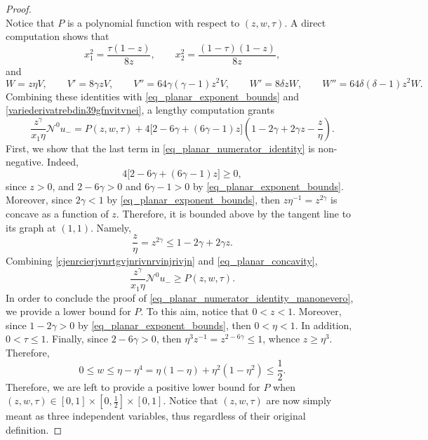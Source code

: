 \documentclass[11pt]{amsart}
\renewcommand{\leq}{\leqslant}
\renewcommand{\geq}{\geqslant}
\renewcommand{\le}{<}
\renewcommand{\ge}{>}
\theoremstyle{definition}
\theoremstyle{remark}
\numberwithin{equation}{section}
\begin{document}
\begin{proof}
\begin{equation*}
\end{equation*}
Notice that $P$ is a polynomial function with respect to $(z,w,\tau)$.
A direct computation shows that 
\begin{equation}\label{duecoseederftrgrrgt}
    x_1^2=\frac{\tau(1-z)}{8z},\qquad x_2^2=\frac{(1-\tau)(1-z)}{8z}, 
\end{equation}
and
\begin{equation}\label{formuleernciefjvntijgvntrvijnvijnvr}
    W=z\eta V,\qquad V'=8\gamma zV,\qquad V''=64\gamma(\gamma-1)z^2V,\qquad W'=8\delta zW,\qquad W''=64\delta(\delta-1)z^2W.
\end{equation}
Combining these identities with \eqref{eq_planar_exponent_bounds} and \eqref{variederivatrebdin39gfnvitvnei}, a lengthy computation grants
\begin{equation}\label{eq_planar_numerator_identity}
 \frac{z^\gamma}{x_1\eta}\mathcal N^0u_-
 =P(z,w,\tau)+4\big[2-6\gamma+(6\gamma-1)z\big]
       \left(1-2\gamma+2\gamma z-\frac z\eta\right).
\end{equation}
First, we show that the last term in \eqref{eq_planar_numerator_identity} is non-negative. Indeed, 
\begin{equation}\label{cjenrcierjvnrtgvjnrivnrvinjrivjn}
    4\big[2-6\gamma+(6\gamma-1)z\big]\geq 0,
\end{equation}
since $z\ge 0$, and $2-6\gamma\ge 0$ and $6\gamma-1\ge 0$ by \eqref{eq_planar_exponent_bounds}. Moreover, since $2\gamma\le 1$ by \eqref{eq_planar_exponent_bounds}, then $z\eta^{-1}=z^{2\gamma}$ is concave as a function of $z$. Therefore, it is bounded above by the tangent line to its graph at $(1,1)$. Namely, \begin{equation}\label{eq_planar_concavity}
 \frac z\eta=z^{2\gamma}\leq 1-2\gamma+2\gamma z.
\end{equation}
Combining \eqref{cjenrcierjvnrtgvjnrivnrvinjrivjn} and \eqref{eq_planar_concavity},
\begin{equation}\label{eq_planar_numerator_identity_2}
 \frac{z^\gamma}{x_1\eta}\mathcal N^0u_-
 \geq P(z,w,\tau).
\end{equation}
In order to conclude the proof of \eqref{eq_planar_numerator_identity_manonevero}, we provide a lower bound for $P$. To this aim, notice that $0<z<1$. Moreover, since $1-2\gamma\ge 0$ by \eqref{eq_planar_exponent_bounds}, then $0\le \eta\le 1$. In addition, $0<\tau\leq 1$. Finally,
since $2-6\gamma\ge  0$, then $\eta^3z^{-1}=z^{2-6\gamma}\leq 1$, whence $z\geq \eta^3$. Therefore,
\[
 0\leq w\leq\eta-\eta^4
 =\eta(1-\eta)+\eta^2(1-\eta^2)\leq\frac12.
\]
Therefore, we are left to provide a positive lower bound for $P$ when $(z,w,\tau)\in[0,1]\times\left[0,\frac{1}{2}\right]\times [0,1]$. Notice that $(z,w,\tau)$ are now simply meant as three independent variables, thus regardless of their original definition. 


\end{proof}
\end{document}
